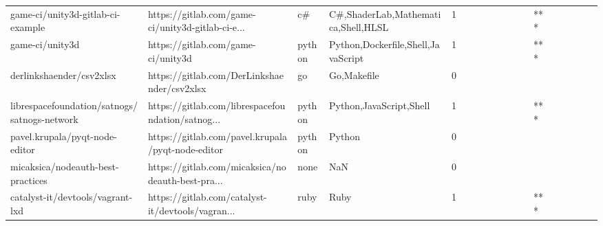 \begin{tabular}{llllrlllllllllllll}
game-ci/unity3d-gitlab-ci-example                  &  https://gitlab.com/game-ci/unity3d-gitlab-ci-e... &                c\# &                C\#,ShaderLab,Mathematica,Shell,HLSL &       1 &         &        &           &                &                 &        &           &       *** &          &          &       &              &          \\
game-ci/unity3d                                    &                 https://gitlab.com/game-ci/unity3d &            python &                 Python,Dockerfile,Shell,JavaScript &       1 &         &        &           &                &                 &        &           &       *** &          &          &       &              &          \\
derlinkshaender/csv2xlsx                           &        https://gitlab.com/DerLinkshaender/csv2xlsx &                go &                                        Go,Makefile &       0 &         &        &           &                &                 &        &           &           &          &          &       &              &          \\
librespacefoundation/satnogs/satnogs-network       &  https://gitlab.com/librespacefoundation/satnog... &            python &                            Python,JavaScript,Shell &       1 &         &        &           &                &                 &        &           &       *** &          &          &       &              &          \\
pavel.krupala/pyqt-node-editor                     &  https://gitlab.com/pavel.krupala/pyqt-node-editor &            python &                                             Python &       0 &         &        &           &                &                 &        &           &           &          &          &       &              &          \\
micaksica/nodeauth-best-practices                  &  https://gitlab.com/micaksica/nodeauth-best-pra... &              none &                                                NaN &       0 &         &        &           &                &                 &        &           &           &          &          &       &              &          \\
catalyst-it/devtools/vagrant-lxd                   &  https://gitlab.com/catalyst-it/devtools/vagran... &              ruby &                                               Ruby &       1 &         &        &           &                &                 &        &           &       *** &          &          &       &              &          \\

\end{tabular}
